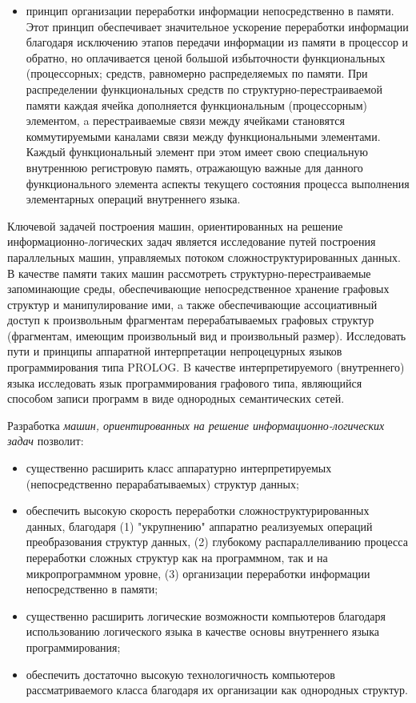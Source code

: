 \begin{itemize}
	\item принцип организации переработки информации непосредственно в памяти. Этот принцип обеспечивает значительное ускорение переработки информации благодаря исключению этапов передачи информации из памяти в процессор и обратно, но оплачивается ценой большой избыточности функциональных (процессорных; средств, равномерно распределяемых по памяти. При распределении функциональных средств по структурно-перестраиваемой памяти каждая ячейка дополняется функциональным (процессорным) элементом, a перестраиваемые связи между ячейками становятся коммутируемыми каналами связи между функциональными элементами. Каждый функциональный элемент при этом имеет свою специальную внутреннюю регистровую память, отражающую важные для данного функционального элемента аспекты текущего состояния процесса выполнения элементарных операций внутреннего языка.
\end{itemize}

Ключевой задачей построения машин, ориентированных на решение информационно-логических задач является исследование путей построения параллельных машин, управляемых потоком сложноструктурированных данных. В качестве памяти таких машин рассмотреть структурно-перестраиваемые запоминающие среды, обеспечивающие непосредственное хранение графовых структур и манипулирование ими, a также обеспечивающие ассоциативный доступ к произвольным фрагментам перерабатываемых графовых структур (фрагментам, имеющим произвольный вид и произвольный размер). Исследовать пути и принципы аппаратной интерпретации непроцецурных языков программирования типа PROLOG. B качестве интерпретируемого (внутреннего) языка исследовать язык программирования графового типа, являющийся способом записи программ в виде однородных семантических сетей.

Разработка \textit{машин, ориентированных на решение информационно-логических задач} позволит:
\begin{itemize}
	\item существенно расширить класс аппаратурно интерпретируемых (непосредственно перарабатываемых) структур данных;
	\item обеспечить высокую скорость переработки сложноструктурированных данных, благодаря (1) "укрупнению" аппаратно реализуемых операций преобразования структур данных, (2) глубокому распараллеливанию процесса переработки сложных структур как на программном, так и на микропрограммном уровне, (3) организации переработки информации непосредственно в памяти;
	\item существенно расширить логические возможности компьютеров благодаря использованию логического языка в качестве основы внутреннего языка программирования;
	\item обеспечить достаточно высокую технологичность компьютеров рассматриваемого класса благодаря их организации как однородных структур.
\end{itemize}

%